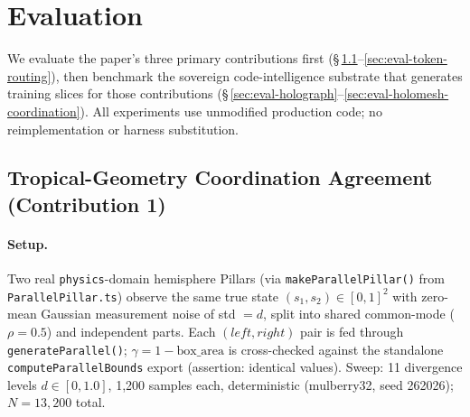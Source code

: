%
%

\section{Evaluation}
\label{sec:evaluation}

We evaluate the paper's three primary contributions first
(\S\,\ref{sec:eval-tropical-gamma}--\ref{sec:eval-token-routing}),
then benchmark the sovereign code-intelligence substrate that generates
training slices for those contributions
(\S\,\ref{sec:eval-holograph}--\ref{sec:eval-holomesh-coordination}).
All experiments use unmodified production code; no reimplementation or
harness substitution.

\subsection{Tropical-Geometry Coordination Agreement (Contribution 1)}
\label{sec:eval-tropical-gamma}

\paragraph{Setup.}
Two real \texttt{physics}-domain hemisphere Pillars (via
\texttt{makeParallelPillar()} from \texttt{ParallelPillar.ts}) observe the
same true state $(s_1, s_2) \in [0,1]^2$ with zero-mean Gaussian measurement
noise of std $= d$, split into shared common-mode ($\rho = 0.5$) and
independent parts.  Each $(left, right)$ pair is fed through
\texttt{generateParallel()};  $\gamma = 1 - \mathrm{box\_area}$ is
cross-checked against the standalone \texttt{computeParallelBounds} export
(assertion: identical values).  Sweep: 11 divergence levels $d \in [0, 1.0]$,
1,200 samples each, deterministic (mulberry32, seed 262026); $N = 13{,}200$
total.

